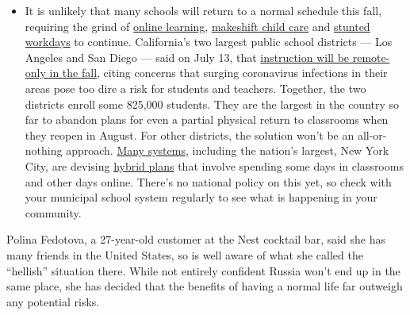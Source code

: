 \begin{itemize}
  \begin{itemize}
  \tightlist
  \item
    It is unlikely that many schools will return to a normal schedule
    this fall, requiring the grind of
    \href{https://www.nytimes3xbfgragh.onion/2020/06/05/us/coronavirus-education-lost-learning.html?action=click\&pgtype=Article\&state=default\&region=MAIN_CONTENT_3\&context=storylines_faq}{online
    learning},
    \href{https://www.nytimes3xbfgragh.onion/2020/05/29/us/coronavirus-child-care-centers.html?action=click\&pgtype=Article\&state=default\&region=MAIN_CONTENT_3\&context=storylines_faq}{makeshift
    child care} and
    \href{https://www.nytimes3xbfgragh.onion/2020/06/03/business/economy/coronavirus-working-women.html?action=click\&pgtype=Article\&state=default\&region=MAIN_CONTENT_3\&context=storylines_faq}{stunted
    workdays} to continue. California's two largest public school
    districts --- Los Angeles and San Diego --- said on July 13, that
    \href{https://www.nytimes3xbfgragh.onion/2020/07/13/us/lausd-san-diego-school-reopening.html?action=click\&pgtype=Article\&state=default\&region=MAIN_CONTENT_3\&context=storylines_faq}{instruction
    will be remote-only in the fall}, citing concerns that surging
    coronavirus infections in their areas pose too dire a risk for
    students and teachers. Together, the two districts enroll some
    825,000 students. They are the largest in the country so far to
    abandon plans for even a partial physical return to classrooms when
    they reopen in August. For other districts, the solution won't be an
    all-or-nothing approach.
    \href{https://bioethics.jhu.edu/research-and-outreach/projects/eschool-initiative/school-policy-tracker/}{Many
    systems}, including the nation's largest, New York City, are
    devising
    \href{https://www.nytimes3xbfgragh.onion/2020/06/26/us/coronavirus-schools-reopen-fall.html?action=click\&pgtype=Article\&state=default\&region=MAIN_CONTENT_3\&context=storylines_faq}{hybrid
    plans} that involve spending some days in classrooms and other days
    online. There's no national policy on this yet, so check with your
    municipal school system regularly to see what is happening in your
    community.
  \end{itemize}
\end{itemize}

Polina Fedotova, a 27-year-old customer at the Nest cocktail bar, said
she has many friends in the United States, so is well aware of what she
called the ``hellish'' situation there. While not entirely confident
Russia won't end up in the same place, she has decided that the benefits
of having a normal life far outweigh any potential risks.

